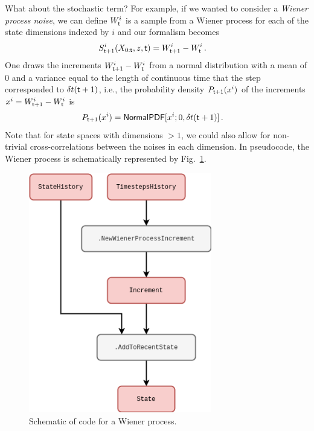What about the stochastic term? For example, if we wanted to consider a \emph{Wiener process noise}, we can define $W^i_{{\sf t}}$ is a sample from a Wiener process for each of the state dimensions indexed by $i$ and our formalism becomes
\begin{align}
& S^{i}_{{\sf t}+1}(X_{0:{\sf t}},z,{\sf t}) = W^i_{{\sf t}+1}-W^i_{\sf t} \label{eq:wiener}\,.
\end{align}
One draws the increments $W^i_{{\sf t}+1}-W^i_{\sf t}$ from a normal distribution with a mean of $0$ and a variance equal to the length of continuous time that the step corresponded to $\delta t({\sf t}+1)$, i.e., the probability density $P_{{\sf t}+1}(x^i)$ of the increments $x^i=W^i_{{\sf t}+1}-W^i_{\sf t}$ is
\begin{align}
P_{{\sf t}+1}(x^i) &= {\sf NormalPDF}[x^i;0,\delta t({\sf t}+1)] \,.
\end{align}
Note that for state spaces with dimensions $>1$, we could also allow for non-trivial cross-correlations between the noises in each dimension. In pseudocode, the Wiener process is schematically represented by Fig.~\ref{fig:wiener-process}.

\begin{figure}[h]
\centering
\includegraphics[width=8cm]{images/chapter-1-wiener-process.drawio.png}
\caption{Schematic of code for a Wiener process.}
\label{fig:wiener-process}
\end{figure}

